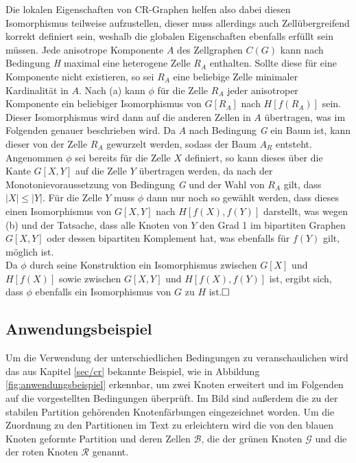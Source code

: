 Die lokalen Eigenschaften von CR-Graphen helfen also dabei diesen Isomorphismus teilweise aufzustellen, dieser muss allerdings auch Zellübergreifend korrekt definiert sein, weshalb die globalen Eigenschaften ebenfalls erfüllt sein müssen.
Jede anisotrope Komponente $A$ des Zellgraphen $C(G)$ kann nach Bedingung \emph{H} maximal eine heterogene Zelle $R_A$ enthalten.
Sollte diese für eine Komponente nicht existieren, so sei $R_A$ eine beliebige Zelle minimaler Kardinalität in $A$.
Nach (a) kann $\phi$ für die Zelle $R_A$ jeder anisotroper Komponente ein beliebiger Isomorphismus von $G[R_A]$ nach $H[f(R_A)]$ sein.
Dieser Isomorphismus wird dann auf die anderen Zellen in $A$ übertragen, was im Folgenden genauer beschrieben wird.
Da $A$ nach Bedingung \emph{G} ein Baum ist, kann dieser von der Zelle $R_A$ gewurzelt werden, sodass der Baum $A_R$ entsteht.
Angenommen $\phi$ sei bereits für die Zelle $X$ definiert, so kann dieses über die Kante $G[X,Y]$ auf die Zelle $Y$ übertragen werden, da nach der Monotonievoraussetzung von Bedingung \emph{G} und der Wahl von $R_A$ gilt, dass $|X|\leq |Y|$.
Für die Zelle $Y$ muss $\phi$ dann nur noch so gewählt werden, dass dieses einen Isomorphismus von $G[X,Y]$ nach $H[f(X),f(Y)]$ darstellt, was wegen (b) und der Tatsache, dass alle Knoten von $Y$ den Grad 1 im bipartiten Graphen $G[X,Y]$ oder dessen bipartiten Komplement hat, was ebenfalls für $f(Y)$ gilt, möglich ist.\\

Da $\phi$ durch seine Konstruktion ein Isomorphismus zwischen $G[X]$ und $H[f(X)]$ sowie zwischen $G[X,Y]$ und $H[f(X),f(Y)]$ ist, ergibt sich, dass $\phi$ ebenfalls ein Isomorphismus von $G$ zu $H$ ist.$\hfill\square$

\subsection{Anwendungsbeispiel}
\label{sec/anwendungsbeispiel}
Um die Verwendung der unterschiedlichen Bedingungen zu veranschaulichen wird das aus Kapitel \ref{sec/cr} bekannte Beispiel, wie in Abbildung \ref{fig:anwendungsbeispiel} erkennbar, um zwei Knoten erweitert und im Folgenden auf die vorgestellten Bedingungen überprüft.
Im Bild sind außerdem die zu der stabilen Partition gehörenden Knotenfärbungen eingezeichnet worden.
Um die Zuordnung zu den Partitionen im Text zu erleichtern wird die von den blauen Knoten geformte Partition und deren Zellen $\mathcal{B}$, die der grünen Knoten $\mathcal{G}$ und die der roten Knoten $\mathcal{R}$ genannt.\\

